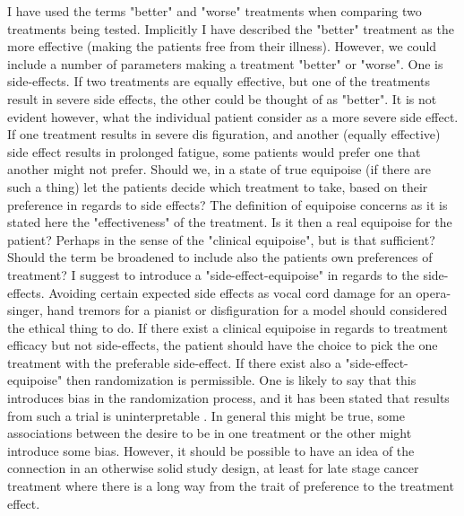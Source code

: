 \documentclass[12p]{article}
\begin{document}
I have used the terms "better" and "worse" treatments when comparing two treatments being tested.
Implicitly I have described the "better" treatment as the more effective (making the patients free from their illness).
However, we could include a number of parameters making a treatment "better" or "worse".
One is side-effects.
If two treatments are equally effective, but one of the treatments result in severe side effects, the other could be thought of as "better".
It is not evident however, what the individual patient consider as a more severe side effect.
If one treatment results in severe dis figuration, and another (equally effective) side effect results in prolonged fatigue, some patients would prefer one that another might not prefer.
Should we, in a state of true equipoise (if there are such a thing) let the patients decide which treatment to take, based on their preference in regards to side effects?
The definition of equipoise concerns as it is stated here the "effectiveness" of the treatment.
Is it then a real equipoise for the patient?
Perhaps in the sense of the "clinical equipoise", but is that sufficient?
Should the term be broadened to include also the patients own preferences of treatment?
I suggest to introduce a "side-effect-equipoise" in regards to the side-effects.
Avoiding certain expected side effects as vocal cord damage for an opera-singer, hand tremors for a pianist or disfiguration for a model should considered the ethical thing to do.
If there exist a clinical equipoise in regards to treatment efficacy but not side-effects, the patient should have the choice to pick the one treatment with the preferable side-effect.
If there exist also a "side-effect-equipoise" then randomization is permissible.
One is likely to say that this introduces bias in the randomization process, and it has been stated that results from such a trial is uninterpretable \cite{kadane}.
In general this might be true, some associations between the desire to be in one treatment or the other might introduce some bias.
However, it should be possible to have an idea of the connection in an otherwise solid study design, at least for late stage cancer treatment where there is a long way from the trait of preference to the treatment effect.
\end{document}
